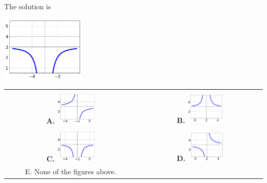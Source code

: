 \documentclass{extbook}[14pt]
\begin{document}
 
 The solution is  
 \begin{center} \includegraphics[width=0.3\textwidth]{../Figures/rationalEquationToGraphAD.png} \end{center}\begin{tabular}{|c|c|} 
\hline 
 & \tabularnewline 
 \textbf{A.} \includegraphics[width=0.3\textwidth]{../Figures/rationalEquationToGraphAA.png} & \textbf{B.} \includegraphics[width=0.3\textwidth]{../Figures/rationalEquationToGraphBA.png} \tabularnewline 
\hline 
 & \tabularnewline 
 \textbf{C.} \includegraphics[width=0.3\textwidth]{../Figures/rationalEquationToGraphCA.png} & \textbf{D.} \includegraphics[width=0.3\textwidth]{../Figures/rationalEquationToGraphDA.png} \tabularnewline 
\hline 
 E. None of the figures above. & \tabularnewline 
\hline 
 \end{tabular} 
 
\end{document}
